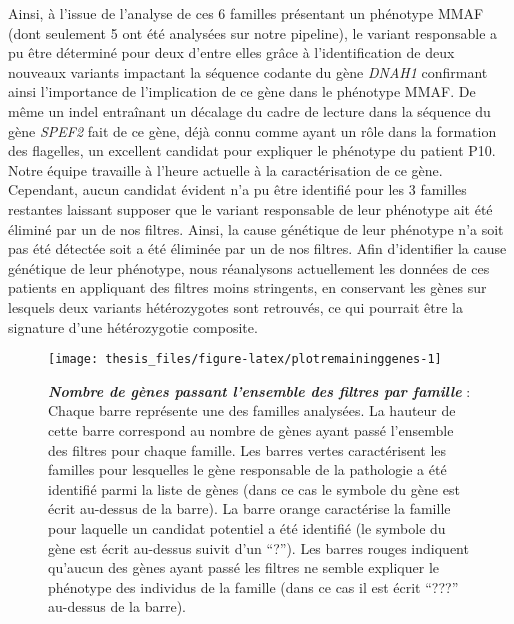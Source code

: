 \documentclass[12pt,a4paper,twoside]{ugathesis}
\begin{document}
Ainsi, à l'issue de l'analyse de ces 6 familles présentant un phénotype
MMAF (dont seulement 5 ont été analysées sur notre pipeline), le variant
responsable a pu être déterminé pour deux d'entre elles grâce à
l'identification de deux nouveaux variants impactant la séquence codante
du gène \emph{DNAH1} confirmant ainsi l'importance de l'implication de
ce gène dans le phénotype MMAF. De même un indel entraînant un décalage
du cadre de lecture dans la séquence du gène \emph{SPEF2} fait de ce
gène, déjà connu comme ayant un rôle dans la formation des flagelles, un
excellent candidat pour expliquer le phénotype du patient P10. Notre
équipe travaille à l'heure actuelle à la caractérisation de ce gène.
Cependant, aucun candidat évident n'a pu être identifié pour les 3
familles restantes laissant supposer que le variant responsable de leur
phénotype ait été éliminé par un de nos filtres. Ainsi, la cause
génétique de leur phénotype n'a soit pas été détectée soit a été
éliminée par un de nos filtres. Afin d'identifier la cause génétique de
leur phénotype, nous réanalysons actuellement les données de ces
patients en appliquant des filtres moins stringents, en conservant les
gènes sur lesquels deux variants hétérozygotes sont retrouvés, ce qui
pourrait être la signature d'une hétérozygotie composite.

\newpage

\begin{figure}

{\centering \texttt{[image: thesis\_files/figure-latex/plotremaininggenes-1]} 

}

\caption[Nombre de gènes passant l'ensemble des filtres par famille]{\textbf{\emph{Nombre de gènes passant
l'ensemble des filtres par famille}} : Chaque barre représente une des
familles analysées. La hauteur de cette barre correspond au nombre de
gènes ayant passé l'ensemble des filtres pour chaque famille. Les barres
vertes caractérisent les familles pour lesquelles le gène responsable de
la pathologie a été identifié parmi la liste de gènes (dans ce cas le
symbole du gène est écrit au-dessus de la barre). La barre orange
caractérise la famille pour laquelle un candidat potentiel a été
identifié (le symbole du gène est écrit au-dessus suivit d'un ``?'').
Les barres rouges indiquent qu'aucun des gènes ayant passé les filtres
ne semble expliquer le phénotype des individus de la famille (dans ce
cas il est écrit ``???'' au-dessus de la barre).}\label{fig:plotremaininggenes}
\end{figure}
\end{document}
